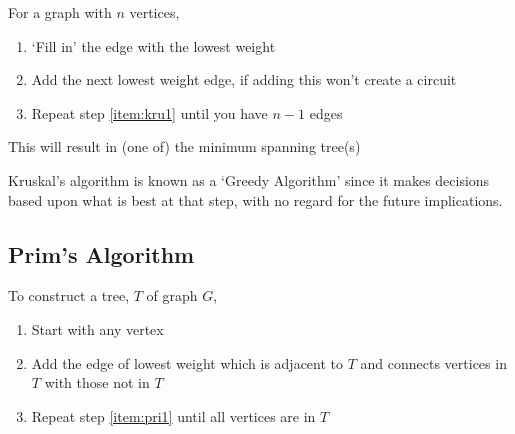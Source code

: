 For a graph with $n$ vertices,
\begin{enumerate}
  \item `Fill in' the edge with the lowest weight
  \item\label{item:kru1} Add the next lowest weight edge, if adding this won't create a circuit
  \item Repeat step \ref*{item:kru1} until you have $n - 1$ edges
\end{enumerate}
This will result in (one of) the minimum spanning tree(s)

Kruskal's algorithm is known as a `Greedy Algorithm' since it makes decisions based upon what is best at that step, with
 no regard for the future implications.

\subsection*{Prim's Algorithm}

To construct a tree, $T$ of graph $G$,
\begin{enumerate}[start=0]
  \item Start with any vertex
  \item\label{item:pri1} Add the edge of lowest weight which is adjacent to $T$ and connects vertices in $T$ with those
   not in $T$
  \item Repeat step \ref*{item:pri1} until all vertices are in $T$
\end{enumerate}


